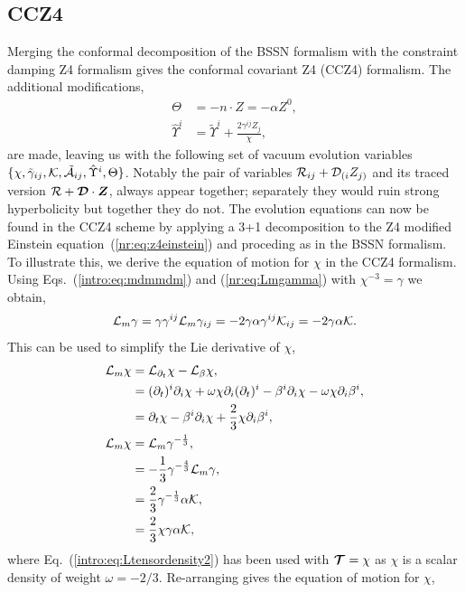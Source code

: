 \subsection{CCZ4} \label{nr:sec:ccz4}
Merging the conformal decomposition of the BSSN formalism with the constraint damping Z4 formalism gives the conformal covariant Z4 (CCZ4) formalism. The additional modifications,
\begin{align} \Theta &= -n\cdot Z  = -\alpha Z^0,\\
\hat{\Upsilon}^i &= \tilde{\Upsilon}^i + \frac{2\gamma^{ij}Z_j}{\chi},\end{align}
are made, leaving us with the following set of vacuum evolution variables $\{\chi, \tilde{\gamma}_{ij},\mathcal{K},\tilde{\mathcal{A}}_{ij},\hat{\Upsilon}^i,\Theta \}$. Notably the pair of variables $\mathcal{R}_{ij} + \mathcal{D}_{(i}Z_{j)}$ and its traced version $\mathcal{R} + \boldsymbol{\mathcal{D}}\cdot \boldsymbol{Z}$, always appear together; separately they would ruin strong hyperbolicity but together they do not. The evolution equations can now be found in the CCZ4 scheme by applying a 3+1 decomposition to the Z4 modified Einstein equation~(\ref{nr:eq:z4einstein}) and proceding as in the BSSN formalism. To illustrate this, we derive the equation of motion for $\chi$ in the CCZ4 formalism. Using Eqs.~(\ref{intro:eq:mdmmdm}) and (\ref{nr:eq:Lmgamma}) with $\chi^{-3}=\gamma$ we obtain,
\begin{align}
\mathcal{L}_m {\gamma} = \gamma \gamma^{ij} \mathcal{L}_m \gamma_{ij} = -2 \gamma \alpha \gamma^{ij} \mathcal{K}_{ij} = -2\gamma \alpha \mathcal{K}.
\end{align}
This can be used to simplify the Lie derivative of $\chi$,
\begin{align}
\mathcal{L}_m \chi &= \mathcal{L}_{\partial_t}\chi - \mathcal{L}_\beta \chi,\\
 &= (\partial_t)^i \partial_i \chi + \omega \chi \partial_i (\partial_t)^i - \beta^i \partial_i \chi - \omega \chi \partial_i \beta^i ,\\
 &= \partial_t \chi - \beta^i \partial_i \chi +\frac{2}{3} \chi\partial_i \beta^i ,\\
\mathcal{L}_m \chi &= \mathcal{L}_m \gamma^{-\frac{1}{3}}  ,\\
&=-\frac{1}{3}\gamma^{-\frac{4}{3}}\mathcal{L}_m \gamma  ,\\
&=\frac{2}{3}\gamma^{-\frac{1}{3}} \alpha \mathcal{K} ,\\
&=\frac{2}{3}\chi\gamma \alpha \mathcal{K} ,
\end{align}
where Eq.~(\ref{intro:eq:Ltensordensity2}) has been used with $\boldsymbol{\mathcal{T}}=\chi$ as $\chi$ is a scalar density of weight $\omega=-2/3$. Re-arranging gives the equation of motion for $\chi$,
